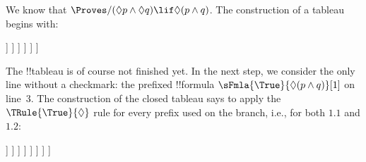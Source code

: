 \documentclass[../../../include/open-logic-section]{subfiles}
\begin{document}
{
\begin{ex}
  We know that $\Proves/ (\Diamond p \land \Diamond q) \lif \Diamond(p
  \land q)$. The construction of a tableau begins with:
  \begin{oltableau}
    [\pFmla{\False}{(\Diamond p \land \Diamond q) \lif \Diamond(p \land q)}{1},
      just = \TAss, checked
      [\pFmla{\True}{\Diamond p \land \Diamond q}{1},
        just = {\TRule{\False}{\lif}[1]}, checked
        [\pFmla{\False}{\Diamond(p \land q)}{1},
          just = {\TRule{\False}{\lif}[1]}
          [\pFmla{\True}{\Diamond p}{1},
            just = {\TRule{\True}{\land}[2]}, checked
            [\pFmla{\True}{\Diamond q}{1},
              just = {\TRule{\True}{\land}[2]}, checked
              [\pFmla{\True}{p}{1.1}, 
                just = {\TRule{\True}{\Diamond}[4]}, checked
                [\pFmla{\True}{q}{1.2}, 
                  just = {\TRule{\True}{\Diamond}[5]}, checked
                ]
              ]
            ]
          ]
        ]
      ]
    ]
  \end{oltableau}
  The !!{tableau} is of course not finished yet. In the next step, we
  consider the only line without a checkmark: the prefixed !!{formula}
  $\sFmla{\True}{\Diamond(p \land q)}[1]$ on line~$3$. The construction of
  the closed tableau says to apply the $\TRule{\True}{\Diamond}$ rule for
  every prefix used on the branch, i.e., for both $1.1$ and $1.2$:
  \begin{oltableau}
    [\pFmla{\False}{\Diamond(p \land q) \lif (\Diamond p \land \Diamond q)}{1},
      just = \TAss, checked
      [\pFmla{\True}{\Diamond p \land \Diamond q}{1},
        just = {\TRule{\False}{\lif}[1]}, checked
        [\pFmla{\False}{\Diamond (p \land q)}{1},
          just = {\TRule{\False}{\lif}[1]}
          [\pFmla{\True}{\Diamond p}{1},
            just = {\TRule{\True}{\land}[2]}, checked
            [\pFmla{\True}{\Diamond q}{1},
              just = {\TRule{\True}{\land}[2]}, checked
              [\pFmla{\True}{p}{1.1}, 
                just = {\TRule{\True}{\Diamond}[4]}, checked
                [\pFmla{\True}{q}{1.2}, 
                  just = {\TRule{\True}{\Diamond}[5]}, checked
                  [\pFmla{\False}{p \land q}{1.1}, 
                    just = {\TRule{\False}{\Diamond}[3]}
                    [\pFmla{\False}{p \land q}{1.2}, 
                      just = {\TRule{\False}{\Diamond}[3]}
                    ]
                  ]
                ]
              ]
            ]
          ]
        ]
      ]
    ]
  \end{oltableau}

\end{ex}}
\end{document}
